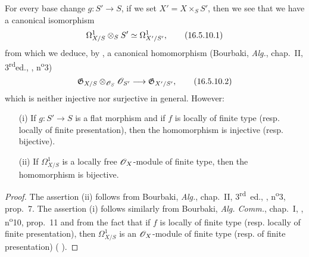 \begin{env}[16.5.10]
\label{IV.16.5.10}
For every base change $g : S' \to S$, if  we set $X' = X \times_S S'$, then we see  that we have a canonical isomorphism
\[
\label{IV.16.5.10.1}
  \Omega_{X/S}^1 \otimes_S S' \simeq \Omega_{X'/S'}^1,
  \tag{16.5.10.1}
\]
from which we deduce, by , a canonical homomorphism (Bourbaki, \emph{Alg.}, chap.~II, 3\textsuperscript{rd}ed., , n\textsuperscript{o}3)
\[
\label{IV.16.5.10.2}
  \mathfrak{G}_{X/S} \otimes_{\sh{O}_S} \sh{O}_{S'} \to \mathfrak{G}_{X'/S'},
  \tag{16.5.10.2}
\]
which is neither injective nor surjective in general.
However:
\end{env}

\begin{proposition}[16.5.11]
\label{IV.16.5.11}
\begin{enumerate}
  \item[{\rm(i)}] If $g : S' \to S$ is a flat morphism and if $f$ is locally of finite type (resp. locally of finite presentation), then the homomorphism  is injective (resp. bijective).
  \item[{\rm(ii)}] If $\Omega_{X/S}^1$ is a locally free $\mathscr{O}_X$-module of finite type, then the homomorphism  is bijective.
\end{enumerate}
\end{proposition}

\begin{proof}
The assertion (ii) follows from Bourbaki, \emph{Alg.}, chap.~II, 3\textsuperscript{rd}~ed., , n\textsuperscript{o}3, prop.~7.
The assertion (i) follows similarly from Bourbaki, \emph{Alg. Comm.}, chap.~I, , n\textsuperscript{o}10, prop.~11 and from the fact that if $f$ is locally of finite type (resp. locally of finite presentation), then $\Omega_{X/S}^1$ is an $\mathscr{O}_X$-module of finite type (resp. of finite presentation) ( ).
\end{proof}

